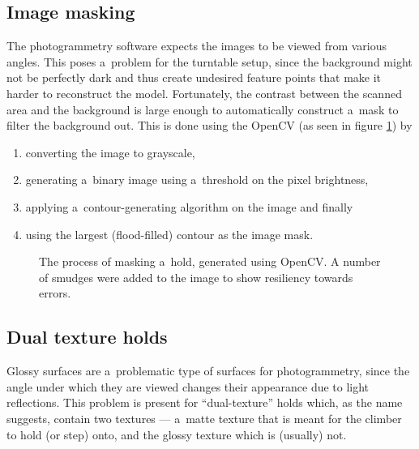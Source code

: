 \subsection{Image masking}
The photogrammetry software expects the images to be viewed from various angles.
This poses a~problem for the turntable setup, since the background might not be perfectly dark and thus create undesired feature points that make it harder to reconstruct the model.
Fortunately, the contrast between the scanned area and the background is large enough to automatically construct a~mask to filter the background out.
This is done using the OpenCV \cite{opencv} (as seen in figure \ref{fig:mask}) by
\begin{enumerate}
	\item converting the image to grayscale,
	\item generating a~binary image using a~threshold on the pixel brightness,
	\item applying a~contour-generating algorithm \cite{suzuki1985topological} on the image and finally
	\item using the largest (flood-filled) contour as the image mask.
\end{enumerate}

\begin{figure}[h]
	\centering
	\hfill
	\hfill
	\hfill
	\hfill
	\caption{The process of masking a~hold, generated using OpenCV. A number of smudges were added to the image to show resiliency towards errors.}%
	\label{fig:mask}
\end{figure}

\subsection{Dual texture holds}\label{sec:dual}
Glossy surfaces are a~problematic type of surfaces for photogrammetry, since the angle under which they are viewed changes their appearance due to light reflections.
This problem is present for ``dual-texture'' holds which, as the name suggests, contain two textures --- a~matte texture that is meant for the climber to hold (or step) onto, and the glossy texture which is (usually) not.

